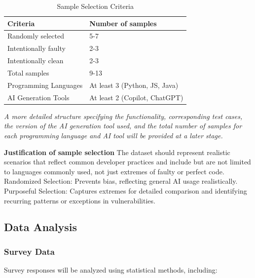 \begin{table}[h!]
    \caption{Sample Selection Criteria}
    \centering
    \renewcommand{\arraystretch}{1.4}
    \begin{tabular}{|l|l|}
    \hline
    \textbf{{Criteria}} & \textbf{{Number of samples}} \\
    \hline
    Randomly selected & 5-7 \\
    \hline
    Intentionally faulty & 2-3 \\
    \hline
    Intentionally clean & 2-3 \\
    \hline
    Total samples & 9-13 \\
    \hline
    Programming Languages & At least 3 (Python, JS, Java) \\
    \hline
    AI Generation Tools & At least 2 (Copilot, ChatGPT) \\
    \hline
    \end{tabular}
\end{table}
\vspace{-0.8em} 
\small\textit{A more detailed structure specifying the functionality, corresponding test cases, the version of the AI generation tool used, and the total number of samples for each programming language and AI tool will be provided at a later stage.}

\textbf{Justification of sample selection}
The dataset should represent realistic scenarios that reflect common developer practices and include but are not limited to languages commonly used, not just extremes of faulty or perfect code. Randomized Selection: Prevents bias, reflecting general AI usage realistically. Purposeful Selection: Captures extremes for detailed comparison and identifying recurring patterns or exceptions in vulnerabilities.

\subsection{Data Analysis}

\subsubsection{Survey Data}

Survey responses will be analyzed using statistical methods, including:


